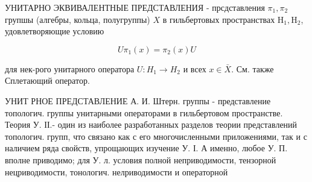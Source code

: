 \documentclass[10pt]{article}
\begin{document}
УНИТАРНО ЭКВИВАЛЕНТНЫЕ ПРЕДСТАВЛЕНИЯ - прсдставления $\pi_{1}, \pi_{2}$ групшы (алгебры, кольца, полугруппы) $X$ в гильбертовых пространствах $\mathrm{H}_{1}, \mathrm{H}_{2}$, удовлетворяющие условию



\[

U \pi_{1}(x)=\pi_{2}(x) U

\]



для нек-рого унитарного оператора $U: H_{1} \rightarrow H_{2}$ и всех $x \in \bar{X}$. См. также Сплетающий оператор.



УНИТ РНОЕ ПРЕДСТАВЛЕНИЕ А. И. Штерн. группы - представление топологич. группы унитарными операторами в гильбертовом пространстве. Теория У. ІІ.- один из наиболее разработанных разделов теории представлений топологич. групп, что связано как с его многочисленными приложениями, так и с наличием ряда свойств, упрощающих изучение У. І. А именно, любое У. П. вполне приводимо; для У. л. условия полной неприводимости, тензорной нецриводимости, тонологич. нелриводимости и операторной
\end{document}
